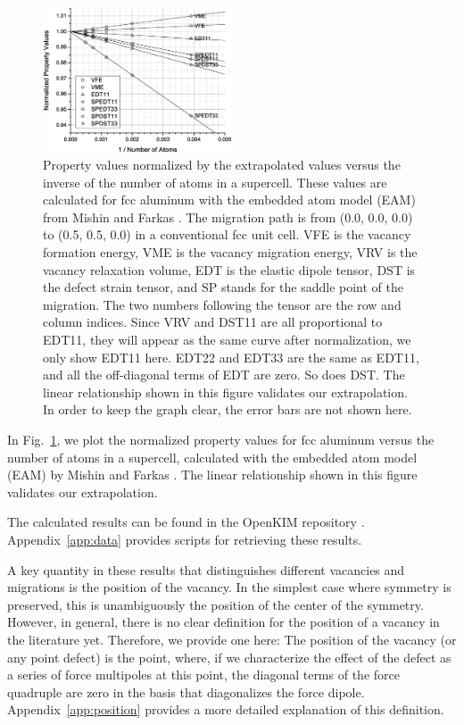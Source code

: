 \documentclass[%
 reprint,
 amsmath,amssymb,
 aps,
]{revtex4-1}
\begin{document}
\begin{figure}
\centering
\includegraphics[width=0.5\textwidth, clip, trim = 10mm 10mm 10mm 10mm]{extrapolation2}%
\caption{\label{fig:extrapolation}
Property values normalized by the extrapolated values versus the inverse of the number of atoms in a supercell.
These values are calculated for fcc aluminum with the embedded atom model (EAM) from Mishin and Farkas \cite{mishin1999interatomic}.
The migration path is from (0.0, 0.0, 0.0) to (0.5, 0.5, 0.0) in a conventional fcc unit cell.
VFE is the vacancy formation energy, VME is the vacancy migration energy, VRV is the vacancy relaxation volume, EDT is the elastic dipole tensor, DST is the defect strain tensor, and SP stands for the saddle point of the migration.
The two numbers following the tensor are the row and column indices.
Since VRV and DST11 are all proportional to EDT11, they will appear as the same curve after normalization, we only show EDT11 here.
EDT22 and EDT33 are the same as EDT11, and all the off-diagonal terms of EDT are zero.
So does DST.
The linear relationship shown in this figure validates our extrapolation.
In order to keep the graph clear, the error bars are not shown here.
}
\end{figure}

In Fig.~\ref{fig:extrapolation}, we plot the normalized property values for fcc aluminum versus the number of atoms in a supercell, calculated with the embedded atom model (EAM) by Mishin and Farkas \cite{mishin1999interatomic}.
The linear relationship shown in this figure validates our extrapolation.

The calculated results can be found in the OpenKIM repository \cite{openkim2016}.
Appendix~\ref{app:data} provides scripts for retrieving these results.

A key quantity in these results that distinguishes different vacancies and migrations is the position of the vacancy.
In the simplest case where symmetry is preserved, this is unambiguously the position of the center of the symmetry.
However, in general, there is no clear definition for the position of a vacancy in the literature yet.
Therefore, we provide one here:
The position of the vacancy (or any point defect) is the point, where, if we characterize the effect of the defect as a series of force multipoles at this point, the diagonal terms of the force quadruple are zero in the basis that diagonalizes the force dipole.
Appendix~\ref{app:position} provides a more detailed explanation of this definition.
\end{document}
